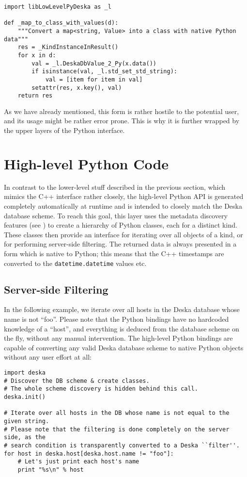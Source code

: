\documentclass[deska]{subfiles}
\begin{document}
\begin{verbatim}
import libLowLevelPyDeska as _l

def _map_to_class_with_values(d):
    """Convert a map<string, Value> into a class with native Python data"""
    res = _KindInstanceInResult()
    for x in d:
        val = _l.DeskaDbValue_2_Py(x.data())
        if isinstance(val, _l.std_set_std_string):
            val = [item for item in val]
        setattr(res, x.key(), val)
    return res
\end{verbatim}

As we have already mentioned, this form is rather hostile to the potential user, and its usage might be rather error
prone.  This is why it is further wrapped by the upper layers of the Python interface.

\section{High-level Python Code}

In contrast to the lower-level stuff described in the previous section, which mimics the C++ interface rather closely,
the high-level Python API is generated completely automatically at runtime and is intended to closely match the Deska
database scheme.  To reach this goal, this layer uses the metadata discovery features (see
) to create a hierarchy of Python classes, each for a distinct kind.  These classes then
provide an interface for iterating over all objects of a kind, or for performing server-side filtering.  The returned
data is always presented in a form which is native to Python; this means that the C++ timestamps are converted to the
{\tt datetime.datetime} values etc.

\subsection{Server-side Filtering}

In the following example, we iterate over all hosts in the Deska database whose name is not ``foo''.  Please note that
the Python bindings have no hardcoded knowledge of a ``host'', and everything is deduced from the database scheme on the
fly, without any manual intervention.  The high-level Python bindings are capable of converting any valid Deska database
scheme to native Python objects without any user effort at all:

\begin{verbatim}
import deska
# Discover the DB scheme & create classes.
# The whole scheme discovery is hidden behind this call.
deska.init()

# Iterate over all hosts in the DB whose name is not equal to the given string.
# Please note that the filtering is done completely on the server side, as the
# search condition is transparently converted to a Deska ``filter''.
for host in deska.host[deska.host.name != "foo"]:
    # Let's just print each host's name
    print "%s\n" % host
\end{verbatim}
\end{document}
